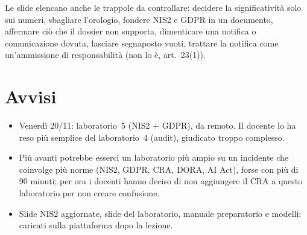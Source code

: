 Le slide elencano anche le trappole da controllare: decidere la significatività solo sui numeri,
sbagliare l'orologio, fondere NIS2 e GDPR in un documento, affermare ciò che il dossier non supporta,
dimenticare una notifica o comunicazione dovuta, lasciare segnaposto vuoti, trattare la notifica come
un'ammissione di responsabilità (non lo è, art.~23(1)).

\section{Avvisi}
\begin{itemize}
  \item Venerdì 20/11: laboratorio~5 (NIS2 + GDPR), da remoto. Il docente lo ha reso più semplice del
    laboratorio~4 (audit), giudicato troppo complesso.
  \item Più avanti potrebbe esserci un laboratorio più ampio su un incidente che coinvolge più norme
    (NIS2, GDPR, CRA, DORA, AI Act), forse con più di 90 minuti; per ora i docenti hanno deciso di non
    aggiungere il CRA a questo laboratorio per non creare confusione.
  \item Slide NIS2 aggiornate, slide del laboratorio, manuale preparatorio e modelli: caricati sulla
    piattaforma dopo la lezione.
\end{itemize}

